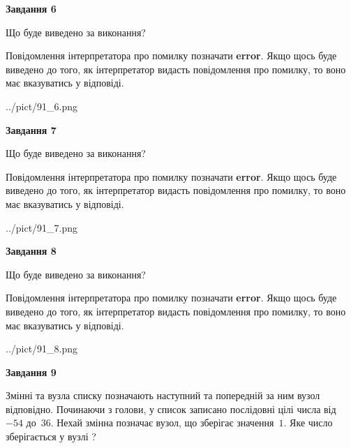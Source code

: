 \documentclass[12pt, ukrainian]{article}
\begin{document}
{\begin {large}
{\begin {center}\textbf{Завдання 6}\end {center}}\par
Що буде виведено за виконання?

Повідомлення інтерпретатора про помилку позначати \textbf{error}.
Якщо щось буде виведено до того, як інтерпретатор видасть повідомлення про помилку, 
то воно має вказуватись у відповіді. \par


\begin{center}
	{../pict/91_6.png}
\end{center}
\newpage

{\begin {center}\textbf{Завдання 7}\end {center}}\par
Що буде виведено за виконання?

Повідомлення інтерпретатора про помилку позначати \textbf{error}.
Якщо щось буде виведено до того, як інтерпретатор видасть повідомлення про помилку, 
то воно має вказуватись у відповіді. \par


\begin{center}
	{../pict/91_7.png}
\end{center}
\newpage

{\begin {center}\textbf{Завдання 8}\end {center}}\par
Що буде виведено за виконання?

Повідомлення інтерпретатора про помилку позначати \textbf{error}.
Якщо щось буде виведено до того, як інтерпретатор видасть повідомлення про помилку, 
то воно має вказуватись у відповіді. \par


\begin{center}
	{../pict/91_8.png}
\end{center}
\newpage

{\begin {center}\textbf{Завдання 9}\end {center}}\par
Змінні  та  вузла списку позначають наступний та попередній за ним вузол відповідно. Починаючи з голови, у список записано послідовні цілі числа від~$-54$ до~$36$. Нехай змінна  позначає вузол, що зберігає значення~$1$.
Яке число зберігається у вузлі  ?\par
\newpage


\end{large}}
\end{document}
